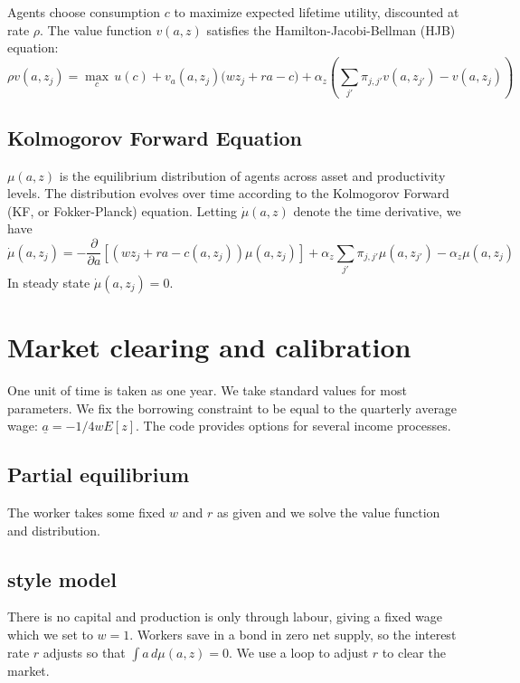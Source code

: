 \documentclass[11pt,english]{article}
\begin{document}
Agents choose consumption \( c \) to maximize expected lifetime utility, discounted at rate \( \rho \). The value function \( v(a, z ) \) satisfies the Hamilton-Jacobi-Bellman (HJB) equation:
\begin{equation}
\label{eq:hjb1}
\rho v(a, z_j) = \max_{c} \, u(c) + v_a(a, z_j )\big(w z_j + r a - c\big)  + \alpha_z \left( \sum_{j'} \pi_{j,j'} v(a, z_{j'}) - v(a, z_j) \right)
\end{equation}

\subsection{Kolmogorov Forward Equation} 

$\mu(a,z)$ is the equilibrium distribution of agents across asset and productivity levels. The distribution evolves over time according to the Kolmogorov Forward (KF, or Fokker-Planck) equation. Letting $\dot \mu(a, z)$ denote the time derivative, we have
\begin{equation}
\label{eq:kf1}
\dot \mu(a, z_j) = - \frac{\partial}{\partial a} \left[ \left( w z_j + r  a - c(a,z_j) \right) \mu(a, z_j) \right]  + \alpha_z \sum_{j'} \pi_{j,j'} \mu(a, z_{j'}) - \alpha_z \mu(a, z_j)
\end{equation}
In steady state $\dot \mu(a, z_j) = 0$. 


\section{Market clearing and calibration} 

One unit of time is taken as one year. We take standard values for most parameters. We fix the borrowing constraint to be equal to the quarterly average wage: $\underline a = -1/4 w E[z]$. The code provides options for several income processes. 

\subsection{Partial equilibrium}

The worker takes some fixed $w$ and $r$ as given and we solve the value function and distribution. 

\subsection{\cite{HuggettRiskfree1993} style model}

There is no capital and production is only through labour, giving a fixed wage which we set to $w=1$. Workers save in a bond in zero net supply, so the interest rate $r$ adjusts so that $\int a \, d\mu(a,z) = 0$. We use a loop to adjust $r$ to clear the market. 
\end{document}
